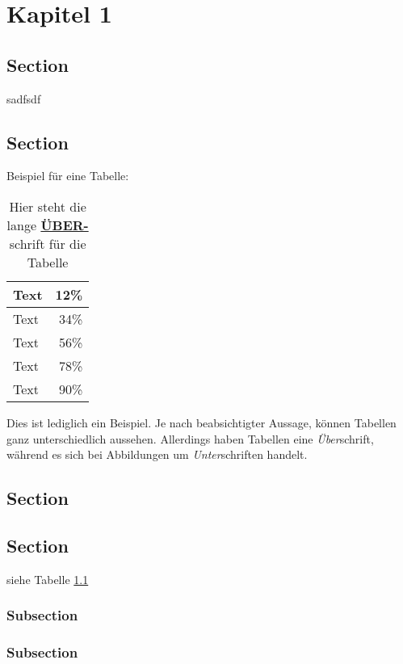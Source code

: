 \chapter{Kapitel 1}

\section{Section}
sadfsdf
\section{Section}
Beispiel für eine Tabelle:
\begin{table}[ht]
	\centering
	\caption[Kurztitel Tabelle]{Hier steht die lange \underline{\textbf{ÜBER-}}schrift für die Tabelle}

		\vspace{1.0em}
		\begin{tabular}{|l|r|}
\hline
Text & 12\% \\
\hline
Text & 34\% \\
\hline
Text & 56\% \\
\hline
Text & 78\% \\
\hline
Text & 90\% \\
\hline
		\end{tabular}
	\label{tab:tabelle}
\end{table}


\noindent{}Dies ist lediglich ein Beispiel. Je nach beabsichtigter Aussage, können Tabellen ganz unterschiedlich aussehen. Allerdings haben Tabellen eine \emph{Über}schrift, während es sich bei Abbildungen um \emph{Unter}schriften handelt.

\section{Section}

\section{Section}
siehe Tabelle \ref{tab:tabelle}

\subsection{Subsection}

\subsection{Subsection}